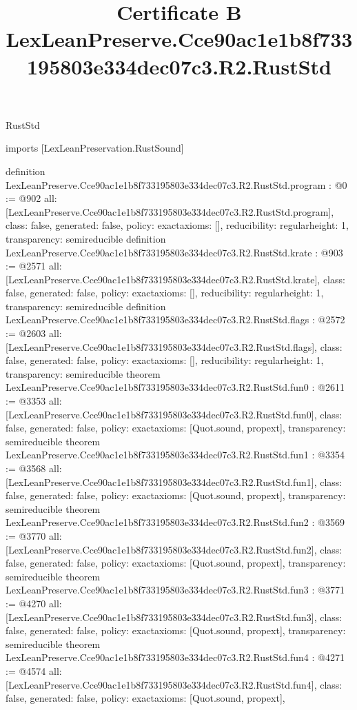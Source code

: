 \begin{lexlean}{RustStd}
\title{Certificate B LexLeanPreserve.Cce90ac1e1b8f733195803e334dec07c3.R2.RustStd}
\begin{coremodule}
imports [LexLeanPreservation.RustSound]

definition LexLeanPreserve.Cce90ac1e1b8f733195803e334dec07c3.R2.RustStd.program : @0 := @902 {
  all: [LexLeanPreserve.Cce90ac1e1b8f733195803e334dec07c3.R2.RustStd.program],
  class: false,
  generated: false,
  policy: exact{axioms: []},
  reducibility: regular{height: 1},
  transparency: semireducible
}
definition LexLeanPreserve.Cce90ac1e1b8f733195803e334dec07c3.R2.RustStd.krate : @903 := @2571 {
  all: [LexLeanPreserve.Cce90ac1e1b8f733195803e334dec07c3.R2.RustStd.krate],
  class: false,
  generated: false,
  policy: exact{axioms: []},
  reducibility: regular{height: 1},
  transparency: semireducible
}
definition LexLeanPreserve.Cce90ac1e1b8f733195803e334dec07c3.R2.RustStd.flags : @2572 := @2603 {
  all: [LexLeanPreserve.Cce90ac1e1b8f733195803e334dec07c3.R2.RustStd.flags],
  class: false,
  generated: false,
  policy: exact{axioms: []},
  reducibility: regular{height: 1},
  transparency: semireducible
}
theorem LexLeanPreserve.Cce90ac1e1b8f733195803e334dec07c3.R2.RustStd.fun0 : @2611 := @3353 {
  all: [LexLeanPreserve.Cce90ac1e1b8f733195803e334dec07c3.R2.RustStd.fun0],
  class: false,
  generated: false,
  policy: exact{axioms: [Quot.sound, propext]},
  transparency: semireducible
}
theorem LexLeanPreserve.Cce90ac1e1b8f733195803e334dec07c3.R2.RustStd.fun1 : @3354 := @3568 {
  all: [LexLeanPreserve.Cce90ac1e1b8f733195803e334dec07c3.R2.RustStd.fun1],
  class: false,
  generated: false,
  policy: exact{axioms: [Quot.sound, propext]},
  transparency: semireducible
}
theorem LexLeanPreserve.Cce90ac1e1b8f733195803e334dec07c3.R2.RustStd.fun2 : @3569 := @3770 {
  all: [LexLeanPreserve.Cce90ac1e1b8f733195803e334dec07c3.R2.RustStd.fun2],
  class: false,
  generated: false,
  policy: exact{axioms: [Quot.sound, propext]},
  transparency: semireducible
}
theorem LexLeanPreserve.Cce90ac1e1b8f733195803e334dec07c3.R2.RustStd.fun3 : @3771 := @4270 {
  all: [LexLeanPreserve.Cce90ac1e1b8f733195803e334dec07c3.R2.RustStd.fun3],
  class: false,
  generated: false,
  policy: exact{axioms: [Quot.sound, propext]},
  transparency: semireducible
}
theorem LexLeanPreserve.Cce90ac1e1b8f733195803e334dec07c3.R2.RustStd.fun4 : @4271 := @4574 {
  all: [LexLeanPreserve.Cce90ac1e1b8f733195803e334dec07c3.R2.RustStd.fun4],
  class: false,
  generated: false,
  policy: exact{axioms: [Quot.sound, propext]},
}
\end{coremodule}
\end{lexlean}
